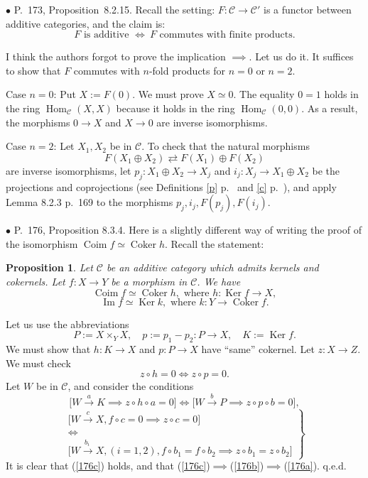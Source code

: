 \documentclass[12pt]{article}
\newtheorem{prop}[thm]{Proposition}
\theoremstyle{remark}%
\newcommand{\bu}{\bullet}
\newcommand{\n}{\noindent}
\newcommand{\C}{\mathcal C}
\newcommand{\pf}{\n{\em Proof. }}
\newcommand{\be}{\begin{equation}}
\newcommand{\ee}{\end{equation}}
\newcommand{\bp}{\begin{prop}}
\newcommand{\ep}{\end{prop}}
\newcommand{\pr}{Proposition}
\DeclareMathOperator{\Coim}{Coim}
\DeclareMathOperator{\Coker}{Coker}
\DeclareMathOperator{\Ima}{Im}
\DeclareMathOperator{\Hom}{Hom}
\DeclareMathOperator{\Ker}{Ker}
\begin{document}

\n$\bu$ P.~173, \pr\ 8.2.15. Recall the setting: $F:\C\to\C'$ is a functor between additive categories, and the claim is: 
$$
F\text{ is additive }\iff\ F\text{ commutes with finite products}.
$$ 

I think the authors forgot to prove the implication $\implies$. Let us do it. It suffices to show that $F$ commutes with $n$-fold products for $n=0$ or $n=2$. 

Case $n=0$: Put $X:=F(0)$. We must prove $X\simeq 0$. The equality $0=1$ holds in the ring $\Hom_\C(X,X)$ because it holds in the ring $\Hom_\C(0,0)$. As a result, the morphisms $0\to X$ and $X\to 0$ are inverse isomorphisms. 

Case $n=2$: Let $X_1,X_2$ be in $\C$. To check that the natural morphisms 
%
\be\label{173} 
F(X_1\oplus X_2)\rightleftarrows F(X_1)\oplus F(X_2)
\ee 
% 
are inverse isomorphisms, let $p_j:X_1\oplus X_2\to X_j$ and $i_j:X_j\to X_1\oplus X_2$ be the projections and coprojections (see Definitions \ref{p} p.~\pageref{p} and \ref{c} p.~\pageref{c}), and apply Lemma 8.2.3 p.~169 to the morphisms $p_j,i_j,F(p_j),F(i_j)$. 


\n$\bu$ P.~176, Proposition 8.3.4. Here is a slightly different way of writing the proof of the isomorphism $\Coim f\simeq\Coker h$. Recall the statement: 
%
\bp 
Let $\C$ be an additive category which admits kernels and cokernels. Let $f:X\to Y$ be a morphism in $\C$. We have 
$$ 
\Coim f\simeq\Coker h,\text{ where }h:\Ker f\to X, 
$$ 
$$ 
\Ima f\simeq\Ker k,\text{ where }k:Y\to\Coker f.  
$$ 
\ep
% 
\pf Let us use the abbreviations 
$$
P:=X\times_YX,\quad p:=p_1-p_2:P\to X,\quad K:=\Ker f.
$$
We must show that $h:K\to X$ and $p:P\to X$ have ``same'' cokernel. Let $z:X\to Z$. We must check 
%
\begin{equation}\label{176a}
z\circ h=0\iff z\circ p=0.
\end{equation}
%
Let $W$ be in $\C$, and consider the conditions 
%
\begin{equation}\label{176b}
\Big[W\overset{a}{\to}K\implies z\circ h\circ a=0\Big]\iff\Big[W\overset{b}{\to}P\implies z\circ p\circ b=0\Big],
\end{equation}
%
\begin{equation}\label{176c}
\left.
\begin{matrix}
\Big[W\overset{c}{\to}X,f\circ c=0\implies z\circ c=0\Big]\\ 
\iff\\ 
\Big[W\overset{b_i\ }{\to}X,(i=1,2),f\circ b_1=f\circ b_2\implies z\circ b_1=z\circ b_2\Big]
\end{matrix}
\right\}
\end{equation}
It is clear that (\ref{176c}) holds, and that (\ref{176c})$\implies$(\ref{176b})$\implies$(\ref{176a}). q.e.d. 
\end{document}
